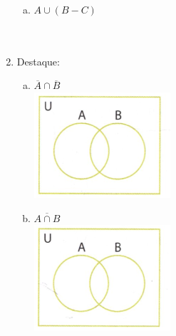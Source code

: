 \documentclass[a4paper,14pt]{article}
\begin{document}
\begin{multicols}{2}
\begin{enumerate}
\begin{enumerate}[a)]
   				\item $A \cup (B - C)$ \\\\\\
   			\end{enumerate}
   			\item Destaque:
   			\begin{enumerate}[a)]
   				\item $\overline{A} \cap \overline{B}$ \\
   				\includegraphics[width=1\linewidth]{6FMA73_imagens/imagem11}
   				\item $\overline{A \cap B}$ \\
   				\includegraphics[width=1\linewidth]{6FMA73_imagens/imagem12}

\end{enumerate}
\end{enumerate}
\end{multicols}
\end{document}
